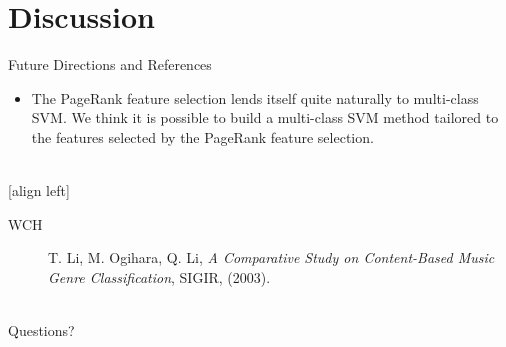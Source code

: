 \documentclass[xcolor=dvipsnames,t]{beamer} %
\begin{document}
\section{Discussion}
\begin{frame}{Future Directions and References}
   \begin{itemize}
      \item The PageRank feature selection lends itself quite naturally to multi-class SVM.  We think it is possible to build a multi-class SVM method tailored to the features selected by the PageRank feature selection.
   \end{itemize}

   ~\\
   [align left] %
   \begin{description}                              %
      \item[WCH] T. Li, M. Ogihara, Q. Li, \emph{A Comparative Study on Content-Based Music Genre Classification}, SIGIR, (2003).\\
   \end{description}
   ~\\
   Questions?

\end{frame}
\end{document}
